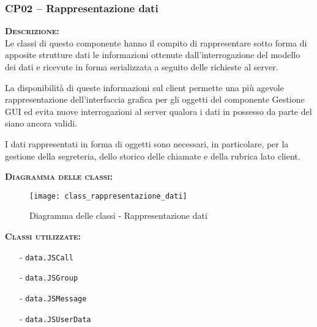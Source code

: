 \subsubsection{CP02 -- Rappresentazione dati}
\begin{description}
  \item{\scshape\bfseries Descrizione:}\\
Le classi di questo componente hanno il compito di rappresentare sotto forma di apposite strutture dati le informazioni ottenute dall'interrogazione del modello dei dati e ricevute in forma serializzata a seguito delle richieste al server.

La disponibilità di queste informazioni sul client permette una più agevole rappresentazione dell'interfaccia grafica per gli oggetti del componente \textsf{Gestione GUI} ed evita nuove interrogazioni al server qualora i dati in possesso da parte del  siano ancora validi.

I dati rappresentati in forma di oggetti sono necessari, in particolare, per la gestione della segreteria, dello storico delle chiamate e della rubrica lato client.

  \item{\scshape\bfseries Diagramma delle classi:}\\
  \begin{figure}[H]
    \centering
    \texttt{[image: class\_rappresentazione\_dati]}
    \caption{Diagramma delle classi - Rappresentazione dati}\label{fig:rappresentazionedati}
  \end{figure}

	\item{\scshape\bfseries Classi utilizzate:} 
	\begin{itemize}[noitemsep,nolistsep]
		\item[-] \texttt{data.JSCall}
		\item[-] \texttt{data.JSGroup}
		\item[-] \texttt{data.JSMessage}
		\item[-] \texttt{data.JSUserData}
	\end{itemize}  
\end{description}

